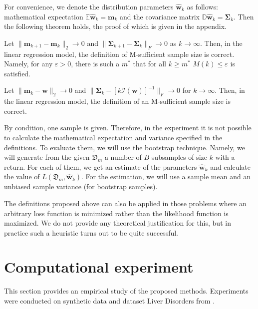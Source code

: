 \documentclass[runningheads]{llncs}
\begin{document}
For convenience, we denote the distribution parameters $\hat{\mathbf{w}}_k$ as follows: mathematical expectation $\mathbb{E}\hat{\mathbf{w}}_k=\mathbf{m}_k$ and the covariance matrix $\mathbb{D} \hat{\mathbf{w}}_k = \mathbf{\Sigma}_k$. Then the following theorem holds, the proof of which is given in the appendix.

\begin{theorem}\label{theorem}
    Let $\|\mathbf{m}_{k+1} - \mathbf{m}_k\|_2 \to 0$ and $\|\mathbf{\Sigma}_{k+1} - \mathbf{\Sigma}_k\|_{F}\to 0$ as $k\to \infty$. Then, in the linear regression model, the definition of M-sufficient sample size is correct. Namely, for any $\varepsilon > 0$, there is such a $m^*$ that for all $k\geqslant m^*$ $M(k)\leqslant\varepsilon$ is satisfied.
\end{theorem}

\begin{corollary}\label{corollary}
    Let $\|\mathbf{m}_k - \mathbf{w}\|_2\to 0$ and $\|\mathbf{\Sigma}_k - \left[k\mathcal{I}(\mathbf{w})\right]^{-1}\|_{F}\to 0$ for $k \to \infty$. Then, in the linear regression model, the definition of an M-sufficient sample size is correct. 
\end{corollary}

By condition, one sample is given. Therefore, in the experiment it is not possible to calculate the mathematical expectation and variance specified in the definitions. To evaluate them, we will use the bootstrap technique. Namely, we will generate from the given $\mathfrak{D}_m$ a number of $B$ subsamples of size $k$ with a return. For each of them, we get an estimate of the parameters $\hat{\mathbf{w}}_{k}$ and calculate the value of $L(\mathfrak{D}_m, \hat{\mathbf{w}}_{k})$. For the estimation, we will use a sample mean and an unbiased sample variance (for bootstrap samples).

The definitions proposed above can also be applied in those problems where an arbitrary loss function is minimized rather than the likelihood function is maximized. We do not provide any theoretical justification for this, but in practice such a heuristic turns out to be quite successful.

\section{Computational experiment}

This section provides an empirical study of the proposed methods. Experiments were conducted on synthetic data and dataset Liver Disorders from \cite{UCI}. 
\end{document}
